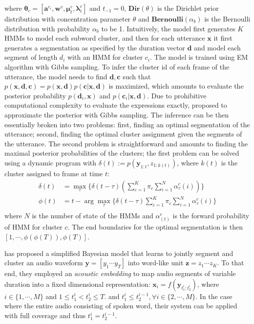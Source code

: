 where $\mathbf \theta_c = [\mathbf a^{c_i}, \mathbf w^c, \mathbf \mu_t^{c}, \mathbf \lambda_i^c]$ and $t_{-1} = 0$, $\mathbf{Dir}(\theta)$ is the Dirichlet prior distribution with concentration parameter $\theta$ and $\mathbf{Bernoulli}(\alpha_b)$ is the Bernoulli distribution with probability $\alpha_b$ to be 1. Intuitively, the model first generates $K$ HMMs to model each subword cluster, and then for each utterance $\mathbf x$ it first generates a segmentation as specified by the duration vector $\mathbf d$ and model each segment of length $d_i$ with an HMM for cluster $c_i$. The model is trained using EM algorithm with Gibbs sampling. To infer the cluster id of each frame of the utterance, the model needs to find $\mathbf d, \mathbf c$ such that $p(\mathbf x, \mathbf d, \mathbf c)=p(\mathbf x, \mathbf d)p(\mathbf c|\mathbf x, \mathbf d)$  is maximized, which amounts to evaluate the posterior probability $p(\mathbf d_i, \mathbf x)$ and $p(\mathbf c_i|\mathbf x, \mathbf d)$. Due to prohibitive computational complexity to evaluate the expressions exactly, \cite{Lee2012} proposed to approximate the posterior with Gibbs sampling. The inference can be then essentially broken into two problems: first, finding an optimal segmentation of the utterance; second, finding the optimal cluster assignment given the segments of the utterance. The second problem is straightforward and amounts to finding the maximal posterior probabilities of the clusters; the first problem can be solved using a dynamic program with $\delta(t) := p(\mathbf y_{1:t}, z_{1:k(t)})$, where $k(t)$ is the cluster assigned to frame at time $t$:
\begin{align}\label{eq:subword_hmm_dp}
    \delta(t) &= \max_{\tau}\{\delta(t-\tau) (\sum_{c=1}^K\pi_c \sum_{i=1}^{N}\alpha^c_{\tau}(i))\} \\
    \phi(t) &= t - \arg \max_{\tau}\{\delta(t-\tau)\sum_{c=1}^K\pi_c \sum_{i=1}^{N}\alpha^c_{\tau}(i)\} \\
\end{align}
where $N$ is the number of state of the HMMs and $\alpha^c_(t)$ is the forward probability of HMM for cluster $c$. The end boundaries for the optimal segmentation is then $[1, \cdots, \phi(\phi(T)), \phi(T)]$.

\cite{Kamper2017} has proposed a simplified Bayesian model that learns to jointly segment and cluster an audio waveform $\mathbf y = [y_1 \cdots y_T]$ into word-like unit $\mathbf z = z_1 \cdots z_K$. To that end, they employed an \textit{acoustic embedding} to map audio segments of variable duration into a fixed dimensional representation: $\mathbf x_i = f(\mathbf y_{t_1^i:t_2^i})$, where $i \in \{1, \cdots, M\}$ and $1 \leq t_1^i < t_2^i \leq T$. and $t_1^i \leq t_2^{i-1}, \forall i \in \{2, \cdots, M\}$. In the case where the entire audio consisting of spoken word, their system can be applied with full coverage and thus $t_1^i = t_2^{i-1}$. 

